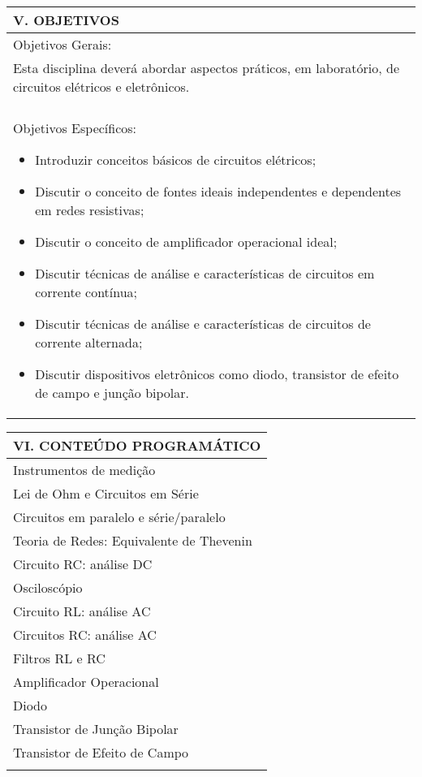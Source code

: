 \documentclass[12pt]{article}
\begin{document}
\begin{longtable}{|L{1.025\textwidth}|} \hline
%
{\bf V. OBJETIVOS } \\ \hline
Objetivos Gerais:\\
Esta disciplina deverá abordar aspectos práticos, em laboratório, de circuitos elétricos e eletrônicos.\\
\\
Objetivos Específicos:
\begin{itemize}
\item Introduzir conceitos básicos de circuitos elétricos;
\item Discutir o conceito de fontes ideais independentes e dependentes em redes resistivas;
\item Discutir o conceito de amplificador operacional ideal;
\item Discutir técnicas de análise e características de circuitos em corrente contínua;
\item Discutir técnicas de análise e características de circuitos de corrente alternada;
\item Discutir dispositivos eletrônicos como diodo, transistor de efeito de campo e junção bipolar.
\end{itemize}
\\ \hline
\end{longtable}


\begin{longtable}{|L{1.025\textwidth}|} \hline
%
{\bf VI. CONTEÚDO PROGRAMÁTICO } \\ \hline
Instrumentos de medição\\
Lei de Ohm e Circuitos em Série\\
Circuitos em paralelo e série/paralelo\\
Teoria de Redes: Equivalente de Thevenin\\
Circuito RC: análise DC\\
Osciloscópio\\
Circuito RL: análise AC\\
Circuitos RC: análise AC\\
Filtros RL e RC\\
Amplificador Operacional\\
Diodo\\
Transistor de Junção Bipolar\\
Transistor de Efeito de Campo\\
\\ \hline
\end{longtable} 
\end{document}
